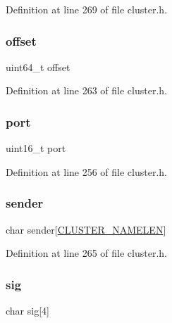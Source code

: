 Definition at line 269 of file cluster.\+h.

\mbox{\label{structcluster_msg_a612bb2807d848cca89ea1437cceea886}} 
\subsubsection{\texorpdfstring{offset}{offset}}
{\footnotesize\ttfamily uint64\+\_\+t offset}



Definition at line 263 of file cluster.\+h.

\mbox{\label{structcluster_msg_a8e0798404bf2cf5dabb84c5ba9a4f236}} 
\subsubsection{\texorpdfstring{port}{port}}
{\footnotesize\ttfamily uint16\+\_\+t port}



Definition at line 256 of file cluster.\+h.

\mbox{\label{structcluster_msg_a81cb807c080c326e68e1ff07d2eaccce}} 
\subsubsection{\texorpdfstring{sender}{sender}}
{\footnotesize\ttfamily char sender\mbox{[}\hyperlink{cluster_8h_ace7a882972eff7149675252938643b6e}{C\+L\+U\+S\+T\+E\+R\+\_\+\+N\+A\+M\+E\+L\+EN}\mbox{]}}



Definition at line 265 of file cluster.\+h.

\mbox{\label{structcluster_msg_a44ca5d775a516861cbad4ea8f7ae5364}} 
\subsubsection{\texorpdfstring{sig}{sig}}
{\footnotesize\ttfamily char sig\mbox{[}4\mbox{]}}



